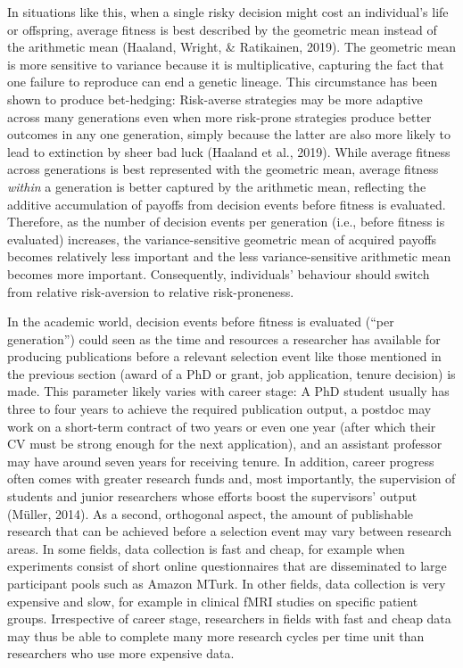 \documentclass[british,,man,mask,floatsintext]{apa6}
\begin{document}
In situations like this, when a single risky decision might cost an individual's life or offspring, average fitness is best described by the geometric mean instead of the arithmetic mean (Haaland, Wright, \& Ratikainen, 2019).
The geometric mean is more sensitive to variance because it is multiplicative, capturing the fact that one failure to reproduce can end a genetic lineage.
This circumstance has been shown to produce bet-hedging:
Risk-averse strategies may be more adaptive across many generations even when more risk-prone strategies produce better outcomes in any one generation, simply because the latter are also more likely to lead to extinction by sheer bad luck (Haaland et al., 2019).
While average fitness across generations is best represented with the geometric mean, average fitness \emph{within} a generation is better captured by the arithmetic mean, reflecting the additive accumulation of payoffs from decision events before fitness is evaluated.
Therefore, as the number of decision events per generation (i.e., before fitness is evaluated) increases, the variance-sensitive geometric mean of acquired payoffs becomes relatively less important and the less variance-sensitive arithmetic mean becomes more important.
Consequently, individuals' behaviour should switch from relative risk-aversion to relative risk-proneness.

In the academic world, decision events before fitness is evaluated (\enquote{per generation}) could seen as the time and resources a researcher has available for producing publications before a relevant selection event like those mentioned in the previous section (award of a PhD or grant, job application, tenure decision) is made.
This parameter likely varies with career stage:
A PhD student usually has three to four years to achieve the required publication output, a postdoc may work on a short-term contract of two years or even one year (after which their CV must be strong enough for the next application), and an assistant professor may have around seven years for receiving tenure.
In addition, career progress often comes with greater research funds and, most importantly, the supervision of students and junior researchers whose efforts boost the supervisors' output (Müller, 2014).
As a second, orthogonal aspect, the amount of publishable research that can be achieved before a selection event may vary between research areas.
In some fields, data collection is fast and cheap, for example when experiments consist of short online questionnaires that are disseminated to large participant pools such as Amazon MTurk.
In other fields, data collection is very expensive and slow, for example in clinical fMRI studies on specific patient groups.
Irrespective of career stage, researchers in fields with fast and cheap data may thus be able to complete many more research cycles per time unit than researchers who use more expensive data.
\end{document}
